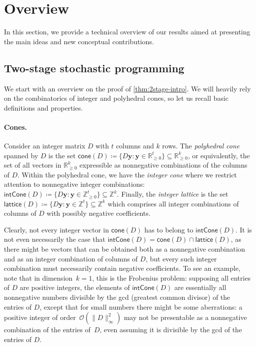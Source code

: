 \documentclass{article}
\renewcommand{\geq}{\geqslant}
\newcommand{\Z}{\mathbb{Z}}
\newcommand{\Zn}{\Z_{\geq 0}}
\newcommand{\R}{\mathbb{R}}
\newcommand{\myRn}{\R_{\geq 0}} %
\newcommand{\tup}[1]{{\mathbf{#1}}}
\newcommand{\yy}{\tup y}
\newcommand{\Oh}{{\mathcal{O}}}
\newcommand{\realcone}{\mathsf{cone}}
\newcommand{\intcone}{\mathsf{intCone}}
\newcommand{\lattice}{\mathsf{lattice}}
\begin{document}
\section{Overview}\label{sec:overview}

In this section, we provide a technical overview of our results aimed at presenting the main ideas and new conceptual contributions.

\subsection{Two-stage stochastic programming}

We start with an overview on the proof of \cref{thm:2stage-intro}. We will heavily rely on the combinatorics of integer and polyhedral cones, so let us recall basic definitions and properties.

\paragraph*{Cones.} Consider an integer  matrix $D$ with $t$ columns and $k$ rows. The {\em{polyhedral cone}} spanned by $D$ is the set $\realcone(D)\coloneqq\{D\yy\colon \yy\in \myRn^t\}\subseteq \myRn^k$, or equivalently, the set of all vectors in $\myRn^k$ expressible as nonnegative combinations of the columns of $D$. Within the polyhedral cone, we have the {\em{integer cone}} where we restrict attention to nonnegative integer combinations: $\intcone(D)\coloneqq\{D\yy\colon \yy\in \Zn^t\}\subseteq \Z^k$. Finally, the {\em{integer lattice}} is the set $\lattice(D)\coloneqq\{D\yy\colon \yy\in \Z^t\}\subseteq \Z^k$ which comprises all integer combinations of columns of $D$ with possibly negative coefficients.

Clearly, not every integer vector in $\realcone(D)$ has to belong to $\intcone(D)$. It is not even necessarily the case that $\intcone(D)=\realcone(D)\cap \lattice(D)$, as there might be vectors that can be obtained both as a nonnegative combination and as an integer combination of columns of $D$, but every such integer combination must necessarily contain negative coefficients. To see an example, note that in dimension~$k=1$, this is the Frobenius problem: supposing all entries of $D$ are positive integers, the elements of $\intcone(D)$ are essentially all nonnegative numbers divisible by the gcd (greatest common divisor) of the entries of $D$, except that for small numbers there might be some aberrations: a positive integer of order~$\Oh(\|D\|_\infty^2)$ may not be presentable as a nonnegative combination of the entries of~$D$, even assuming it is divisible by the gcd of the entries of $D$.
\end{document}

